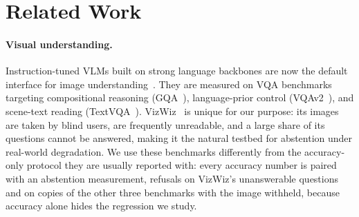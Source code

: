\section{Related Work}
\label{sec:related}

\paragraph{Visual understanding.}
Instruction-tuned VLMs built on strong language backbones are now the default interface
for image understanding~\cite{qwen3vl2025,wang2025internvl35,gemmateam2025gemma3technicalreport}.
They are measured on VQA benchmarks targeting compositional reasoning
(GQA~\cite{hudson2019gqa}), language-prior control (VQAv2~\cite{goyal2017vqav2}), and
scene-text reading (TextVQA~\cite{singh2019textvqa}). VizWiz~\cite{gurari2018vizwiz} is
unique for our purpose: its images are taken by blind users, are frequently unreadable,
and a large share of its questions cannot be answered, making it the natural testbed for
abstention under real-world degradation. We use these benchmarks differently from the
accuracy-only protocol they are usually reported with: every accuracy number is paired
with an abstention measurement, refusals on VizWiz's unanswerable questions and on copies
of the other three benchmarks with the image withheld, because accuracy alone hides the
regression we study.


